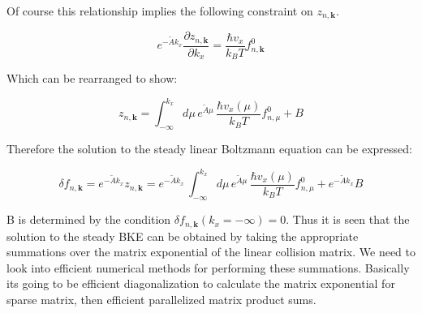 \documentclass[preprint,12pt]{elsarticle}
\begin{document}
\noindent Of course this relationship implies the following constraint on $z_{n,\mathbf{k}}$.

\begin{equation}
    e^{- \tilde{A} k_x} \frac{\partial z_{n,\mathbf{k}}}{\partial k_x} = \frac{\hbar v_x}{k_B T} f_{n,\mathbf{k}}^0
\end{equation}

\noindent Which can be rearranged to show:

\begin{equation}
    z_{n,\mathbf{k}} = \int_{-\infty}^{k_x} d\mu \, e^{\tilde{A} \mu} \, \frac{\hbar v_x(\mu)}{k_B T} f_{n,\mu}^0 + B
\end{equation}

\noindent Therefore the solution to the steady linear Boltzmann equation can be expressed:

\begin{equation}
    \delta f_{n,\mathbf{k}} = e^{- \tilde{A} k_x} z_{n,\mathbf{k}} = e^{- \tilde{A} k_x} \,  \int_{-\infty}^{k_x} d\mu \, e^{\tilde{A} \mu} \, \frac{\hbar v_x(\mu)}{k_B T} f_{n,\mu}^0 + e^{- \tilde{A} k_x} B
\end{equation}

\noindent B is determined by the condition $\delta f_{n,\mathbf{k}}(k_x = -\infty) = 0$. Thus it is seen that the solution to the steady BKE can be obtained by taking the appropriate summations over the matrix exponential of the linear collision matrix. We need to look into efficient numerical methods for performing these summations. Basically its going to be efficient diagonalization to calculate the matrix exponential for sparse matrix, then efficient parallelized matrix product sums.
\end{document}
